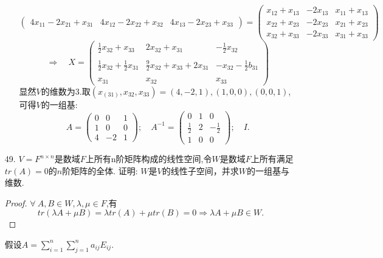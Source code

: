 \documentclass{article}
\begin{document}
\begin{enumerate}
\begin{enumerate}
\[\begin{pmatrix}
                4x_{11}-2x_{21}+x_{31} & 4x_{12}-2x_{22}+x_{32} & 4x_{13}-2x_{23}+x_{33}
            \end{pmatrix}
            =\begin{pmatrix}
                x_{12} +x_{13} & -2x_{13} & x_{11}+x_{13}\\
                x_{22} +x_{23} & -2x_{23} & x_{21}+x_{23}\\
                x_{32} +x_{33} & -2x_{33} & x_{31}+x_{33}
            \end{pmatrix}
        \]
        \[
            \Rightarrow\quad
            X=\begin{pmatrix}
                \frac{1}{2}x_{32}+x_{33} & 2x_{32}+x_{31} & -\frac{1}{2}x_{32}\\
                & & \\
                \frac{1}{2}x_{32}+\frac{1}{2}x_{31} & \frac{9}{2}x_{32}+x_{33}+2x_{31} & -x_{32}-\frac{1}{2}b_{31}\\
                & & \\
                x_{31} & x_{32} & x_{33}
            \end{pmatrix}
        \]
        显然$V$的维数为3.取$(x_(31),x_{32},x_{33})=(4,-2,1),(1,0,0),(0,0,1)$,可得$V$的一组基:
        \[
            A=
            \begin{pmatrix}
                0 & 0 & 1\\
                1 & 0 & 0\\
                4 & -2 & 1
            \end{pmatrix};\quad
            A^{-1}=
            \begin{pmatrix}
                0 & 1 & 0\\
                \frac{1}{2} & 2 & -\frac{1}{2}\\
                1 & 0 & 0
            \end{pmatrix};\quad I.
        \]
    \end{enumerate}
    \item [49.]$V=F^{n\times n}$是数域$F$上所有n阶矩阵构成的线性空间,令$W$是数域$F$上所有满足$tr(A)=0$的$n$阶矩阵的全体.
    证明: $W$是$V$的线性子空间，并求$W$的一组基与维数.
    \begin{proof}
        $\forall\ A,B\in W,\lambda,\mu \in F$,有
        \[
            tr(\lambda A+\mu B)=\lambda tr(A)+\mu tr(B)=0
            \Rightarrow
            \lambda A+\mu B \in W.
        \]
    \end{proof}
    假设$A=\displaystyle{\sum\limits_{i=1}^n \sum\limits_{j=1}^n a_{ij} E_{ij}}$.

\end{enumerate}
\end{document}
